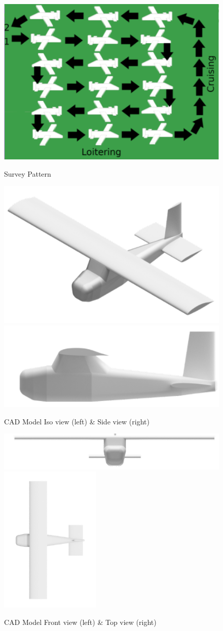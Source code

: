 \documentclass[12pt,A4paper]{article}
\begin{document}
	\begin{figure}[!h]
		\centering
		\includegraphics[width=.5\textwidth]{Holding.PNG} \label{fig:f10}
		\caption{Survey Pattern}
	\end{figure}
	\begin{figure}[!h]
		\centering
		\includegraphics[width=.4\textwidth]{IsoCad.PNG}\hspace{.2 in} \label{fig:f11}
		\includegraphics[width=.4\textwidth]{side.PNG} \label{fig:f12}
		\caption{CAD Model Iso view (left) \& Side view (right)}
	\end{figure}
	\begin{figure}[!h]
		\centering
		\includegraphics[width=.6\textwidth]{Front.PNG} \label{fig:f13}
		\includegraphics[width=.2\textwidth]{Top.PNG} \label{fig:f14}
		\caption{CAD Model Front view (left) \& Top view (right)}
	\end{figure}
	\clearpage
\end{document}
